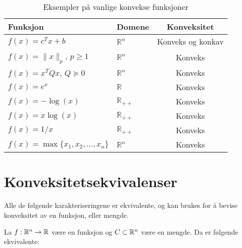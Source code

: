 \begin{table}[H]
	\centering
	\begin{tabular}{|l|l|c|}
		\hline
		\textbf{Funksjon}                          & \textbf{Domene}       & \textbf{Konveksitet} \\
		\hline
		\( f(x) = c^Tx + b \)                      & \( \mathbb{R}^n \)    & Konveks og konkav    \\
		\( f(x) = \|x\|_p \), \( p \geq 1 \)       & \( \mathbb{R}^n \)    & Konveks              \\
		\( f(x) = x^TQx \), \( Q \succeq 0 \)      & \( \mathbb{R}^n \)    & Konveks              \\
		\( f(x) = e^x \)                           & \( \mathbb{R} \)      & Konveks              \\
		\( f(x) = -\log(x) \)                      & \( \mathbb{R}_{++} \) & Konveks              \\
		\( f(x) = x\log(x) \)                      & \( \mathbb{R}_{++} \) & Konveks              \\
		\( f(x) = 1/x \)                           & \( \mathbb{R}_{++} \) & Konveks              \\
		\( f(x) = \max\{x_1, x_2, \ldots, x_n\} \) & \( \mathbb{R}^n \)    & Konveks              \\
		\hline
	\end{tabular}
	\caption{Eksempler på vanlige konvekse funksjoner}
	\label{tab:convex_functions}
\end{table}

\section{Konveksitetsekvivalenser}
Alle de følgende karakteriseringene er ekvivalente, og kan brukes for å bevise konveksitet av en funksjon, eller mengde.

La \(f: \mathbb{R}^n \to \mathbb{R}\) være en funksjon og \(C \subset \mathbb{R}^n\) være en mengde. Da er følgende ekvivalente:

